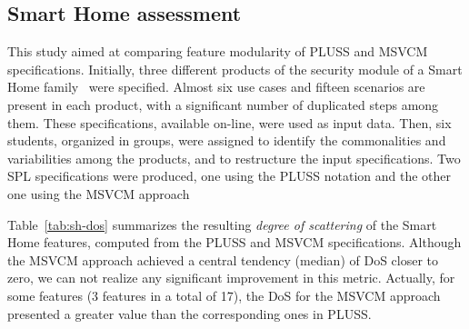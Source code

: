 \subsection{Smart Home assessment}

This study aimed at comparing feature modularity of PLUSS and MSVCM
specifications. Initially, three different products of the security module of a
Smart Home family~\cite{Pohl:2005aa} were specified. Almost six use cases and
fifteen scenarios are present in each product, with a significant number of
duplicated steps among them. These specifications, available on-line, were used
as input data. Then, six students, organized in groups, were assigned to identify
the commonalities and variabilities among the products, and to restructure the
input specifications. Two SPL specifications were produced, one using the PLUSS
notation and the other one using the MSVCM approach




Table~\ref{tab:sh-dos} summarizes the resulting \emph{degree of scattering} of
the Smart Home features, computed from the PLUSS and MSVCM specifications.
Although the MSVCM approach achieved a central tendency (median) of DoS closer to
zero, we can not realize any significant improvement in this metric. Actually,
for some features (3 features in a total of 17), the DoS for the MSVCM approach
presented a greater value than the corresponding ones in PLUSS.


